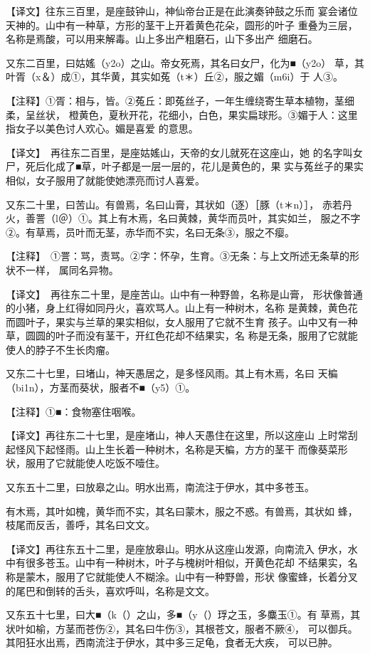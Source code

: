 \documentclass[a4paper,12pt,UTF8,twoside]{ctexbook}
\begin{document}
【译文】往东三百里，是座鼓钟山，神仙帝台正是在此演奏钟鼓之乐而 宴会诸位天神的。山中有一种草，方形的茎干上开着黄色花朵，圆形的叶子 重叠为三层，名称是焉酸，可以用来解毒。山上多出产粗磨石，山下多出产 细磨石。

又东二百里，曰姑媱（y2o）之山。帝女死焉，其名曰女尸，化为■（y2o） 草，其叶胥（x＆）成①，其华黄，其实如菟（t＊）丘②，服之媚（m6i）于 人③。

【注释】①胥：相与，皆。②菟丘：即菟丝子，一年生缠绕寄生草本植物，茎细柔，呈丝状， 橙黄色，夏秋开花，花细小，白色，果实扁球形。③媚于人：这里指女子以美色讨人欢心。媚是喜爱 的意思。

【译文】　再往东二百里，是座姑媱山，天帝的女儿就死在这座山，她 的名字叫女尸，死后化成了■草，叶子都是一层一层的，花儿是黄色的，果 实与菟丝子的果实相似，女子服用了就能使她漂亮而讨人喜爱。

又东二十里，曰苦山。有兽焉，名曰山膏，其状如（逐）［豚（t＊n）］， 赤若丹火，善詈（l＠）①。其上有木焉，名曰黄棘，黄华而员叶，其实如兰， 服之不字②。有草焉，员叶而无茎，赤华而不实，名曰无条③，服之不瘿。

【注释】　①詈：骂，责骂。②字：怀孕，生育。③无条：与上文所述无条草的形状不一样， 属同名异物。

【译文】　再往东二十里，是座苦山。山中有一种野兽，名称是山膏， 形状像普通的小猪，身上红得如同丹火，喜欢骂人。山上有一种树木，名称 是黄棘，黄色花而圆叶子，果实与兰草的果实相似，女人服用了它就不生育 孩子。山中又有一种草，圆圆的叶子而没有茎干，开红色花却不结果实，名 称是无条，服用了它就能使人的脖子不生长肉瘤。

又东二十七里，曰堵山，神天愚居之，是多怪风雨。其上有木焉，名曰 天楄（bi1n），方茎而葵状，服者不■（y5）①。

【注释】①■：食物塞住咽喉。

【译文】再往东二十七里，是座堵山，神人天愚住在这里，所以这座山 上时常刮起怪风下起怪雨。山上生长着一种树木，名称是天楄，方方的茎干 而像葵菜形状，服用了它就能使人吃饭不噎住。

又东五十二里，曰放皋之山。明水出焉，南流注于伊水，其中多苍玉。

有木焉，其叶如槐，黄华而不实，其名曰蒙木，服之不惑。有兽焉，其状如 蜂，枝尾而反舌，善呼，其名曰文文。

【译文】再往东五十二里，是座放皋山。明水从这座山发源，向南流入 伊水，水中有很多苍玉。山中有一种树木，叶子与槐树叶相似，开黄色花却 不结果实，名称是蒙木，服用了它就能使人不糊涂。山中有一种野兽，形状 像蜜蜂，长着分叉的尾巴和倒转的舌头，喜欢呼叫，名称是文文。

又东五十七里，曰大■（k（）之山，多■（y（）琈之玉，多麋玉①。有 草焉，其状叶如榆，方茎而苍伤②，其名曰牛伤③，其根苍文，服者不厥④， 可以御兵。其阳狂水出焉，西南流注于伊水，其中多三足龟，食者无大疾， 可以已肿。
\end{document}

